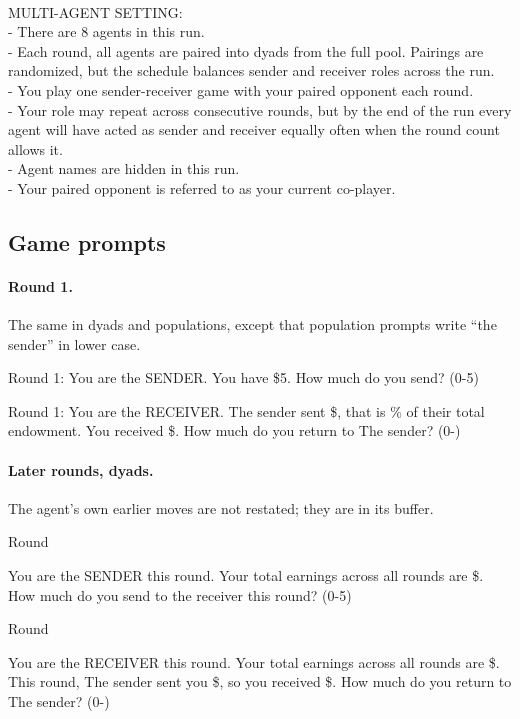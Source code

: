\begin{promptbox}
\\
MULTI-AGENT SETTING:\\
- There are 8 agents in this run.\\
- Each round, all agents are paired into dyads from the full pool. Pairings are randomized, but the schedule balances sender and receiver roles across the run.\\
- You play one sender-receiver game with your paired opponent each round.\\
- Your role may repeat across consecutive rounds, but by the end of the run every agent will have acted as sender and receiver equally often when the round count allows it.\\
- Agent names are hidden in this run.\\
- Your paired opponent is referred to as your current co-player.
\end{promptbox}

\subsection{Game prompts}
\paragraph{Round 1.} The same in dyads and populations, except that population prompts write ``the sender'' in lower case.
\begin{promptbox}
Round 1: You are the SENDER. You have \$5. How much do you send? (0-5)
\end{promptbox}
\begin{promptbox}
Round 1: You are the RECEIVER. The sender sent \$, that is \% of their total endowment. You received \$. How much do you return to The sender? (0-)
\end{promptbox}

\paragraph{Later rounds, dyads.} The agent's own earlier moves are not restated; they are in its buffer.
\begin{promptbox}
Round 

You are the SENDER this round. Your total earnings across all rounds are \$.\\
How much do you send to the receiver this round? (0-5)
\end{promptbox}
\begin{promptbox}
Round 

You are the RECEIVER this round. Your total earnings across all rounds are \$.\\
This round, The sender sent you \$, so you received \$. How much do you return to The sender? (0-)
\end{promptbox}

